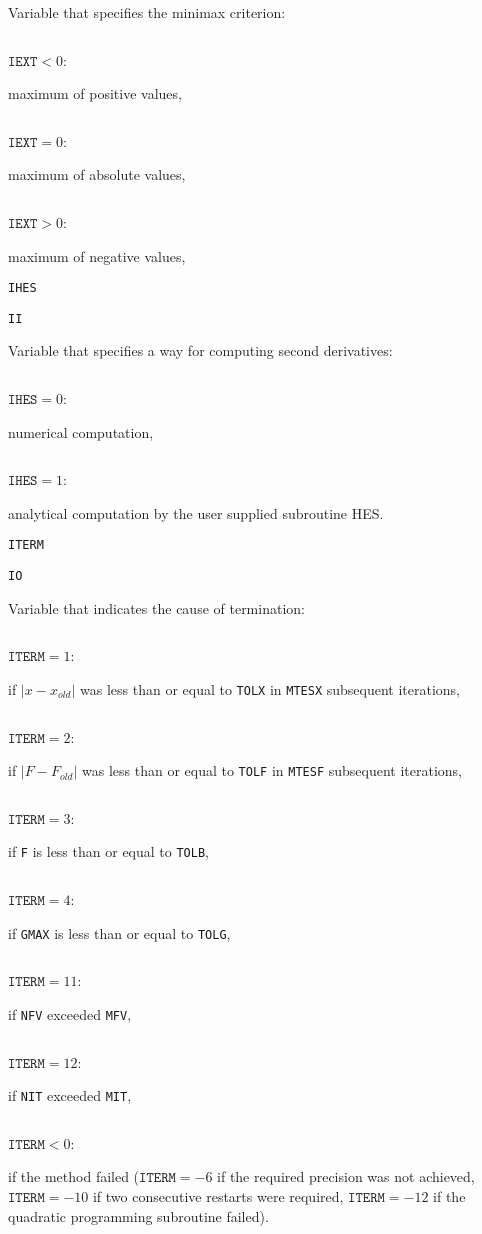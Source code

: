 \documentclass{article}
\begin{document}
{{  Variable that specifies the minimax criterion:}
  \par\vspace{1mm}
\noindent\parbox{30mm}{$\;$}\parbox{20mm}{$\texttt{IEXT}<0$:}\parbox[t]{71mm}{
  maximum of positive values,}
  \par
\noindent\parbox{30mm}{$\;$}\parbox{20mm}{$\texttt{IEXT}=0$:}\parbox[t]{71mm}{
  maximum of absolute values,}
  \par
\noindent\parbox{30mm}{$\;$}\parbox{20mm}{$\texttt{IEXT}>0$:}\parbox[t]{71mm}{
  maximum of negative values,}
  \par\vspace{2mm}
\noindent\parbox{20mm}{\texttt{IHES}}\parbox{10mm}{\texttt{II}}\parbox[t]{91mm}{
  Variable that specifies a way for computing second derivatives:}
  \par\vspace{1mm}
\noindent\parbox{30mm}{$\;$}\parbox{20mm}{$\texttt{IHES}=0$:}\parbox[t]{71mm}{
  numerical computation,}
  \par
\noindent\parbox{30mm}{$\;$}\parbox{20mm}{$\texttt{IHES}=1$:}\parbox[t]{71mm}{
  analytical computation by the user supplied subroutine HES.}
  \par\vspace{2mm}
\noindent\parbox{20mm}{\texttt{ITERM}}\parbox{10mm}{\texttt{IO}}\parbox[t]{91mm}{
  Variable that indicates the cause of termination:}
  \par\vspace{1mm}
\noindent\parbox{30mm}{$\;$}\parbox{20mm}{$\texttt{ITERM}=1$:}\parbox[t]{71mm}{
  if $|x - x_{old}|$ was less than or equal to \texttt{TOLX} in \texttt{MTESX}
  subsequent iterations,}
  \par
\noindent\parbox{30mm}{$\;$}\parbox{20mm}{$\texttt{ITERM}=2$:}\parbox[t]{71mm}{
  if $|F - F_{old}|$ was less than or equal to \texttt{TOLF} in \texttt{MTESF}
  subsequent iterations,}
  \par
\noindent\parbox{30mm}{$\;$}\parbox{20mm}{$\texttt{ITERM}=3$:}\parbox[t]{71mm}{
  if \texttt{F} is less than or equal to \texttt{TOLB},}
  \par
\noindent\parbox{30mm}{$\;$}\parbox{20mm}{$\texttt{ITERM}=4$:}\parbox[t]{71mm}{
  if \texttt{GMAX} is less than or equal to \texttt{TOLG},}
  \par
\noindent\parbox{30mm}{$\;$}\parbox{20mm}{$\texttt{ITERM}=11$:}\parbox[t]{71mm}{
  if \texttt{NFV} exceeded \texttt{MFV},}
  \par
\noindent\parbox{30mm}{$\;$}\parbox{20mm}{$\texttt{ITERM}=12$:}\parbox[t]{71mm}{
  if \texttt{NIT} exceeded \texttt{MIT},}
  \par
\noindent\parbox{30mm}{$\;$}\parbox{20mm}{$\texttt{ITERM}<0$:}\parbox[t]{71mm}{
  if the method failed ({$\texttt{ITERM}=-6$} if the required precision was not achieved,
  {$\texttt{ITERM}=-10$} if two consecutive restarts were required, {$\texttt{ITERM}=-12$}
  if the quadratic programming subroutine failed).}

}
\end{document}
